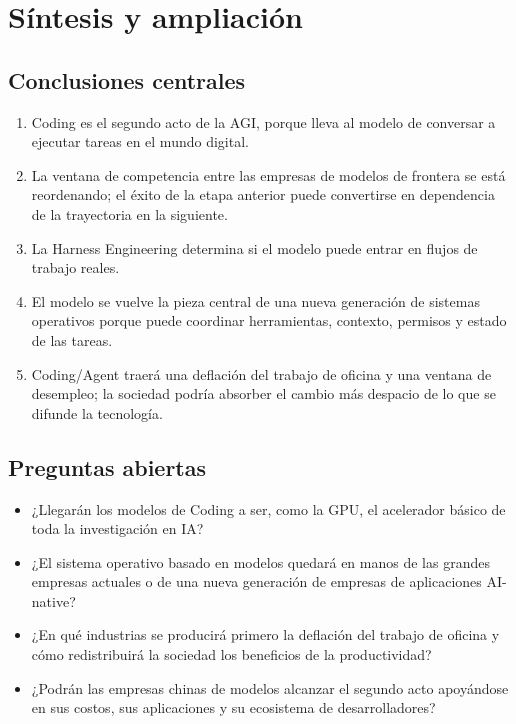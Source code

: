 \section{Síntesis y ampliación}

\subsection{Conclusiones centrales}

\begin{enumerate}
\item Coding es el segundo acto de la AGI, porque lleva al modelo de conversar a ejecutar tareas en el mundo digital.
\item La ventana de competencia entre las empresas de modelos de frontera se está reordenando; el éxito de la etapa anterior puede convertirse en dependencia de la trayectoria en la siguiente.
\item La Harness Engineering determina si el modelo puede entrar en flujos de trabajo reales.
\item El modelo se vuelve la pieza central de una nueva generación de sistemas operativos porque puede coordinar herramientas, contexto, permisos y estado de las tareas.
\item Coding/Agent traerá una deflación del trabajo de oficina y una ventana de desempleo; la sociedad podría absorber el cambio más despacio de lo que se difunde la tecnología.
\end{enumerate}

\subsection{Preguntas abiertas}

\begin{itemize}
\item ¿Llegarán los modelos de Coding a ser, como la GPU, el acelerador básico de toda la investigación en IA?
\item ¿El sistema operativo basado en modelos quedará en manos de las grandes empresas actuales o de una nueva generación de empresas de aplicaciones AI-native?
\item ¿En qué industrias se producirá primero la deflación del trabajo de oficina y cómo redistribuirá la sociedad los beneficios de la productividad?
\item ¿Podrán las empresas chinas de modelos alcanzar el segundo acto apoyándose en sus costos, sus aplicaciones y su ecosistema de desarrolladores?
\end{itemize}

